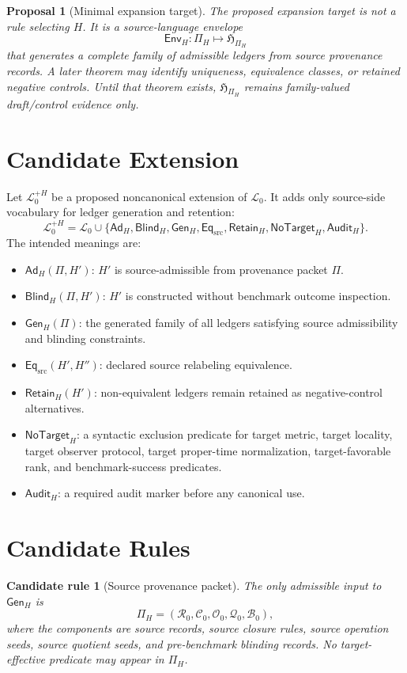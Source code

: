 \documentclass[11pt]{article}
\newcommand{\Lang}{\mathcal{L}_{0}}
\newcommand{\LangPlus}{\mathcal{L}_{0}^{+H}}
\newcommand{\LedgerFam}{\mathfrak{H}}
\newcommand{\PiH}{\Pi_H}
\newcommand{\Ad}{\mathsf{Ad}}
\newcommand{\Blind}{\mathsf{Blind}}
\newcommand{\GenH}{\mathsf{Gen}_{H}}
\newcommand{\EnvH}{\mathsf{Env}_{H}}
\newcommand{\EqSrc}{\mathsf{Eq}_{\mathrm{src}}}
\newcommand{\Retain}{\mathsf{Retain}}
\newcommand{\NoTarget}{\mathsf{NoTarget}}
\newcommand{\Audit}{\mathsf{Audit}}
\newtheorem{proposal}{Proposal}
\newtheorem{axiomcandidate}{Candidate rule}
\begin{document}
\begin{proposal}[Minimal expansion target]
The proposed expansion target is not a rule selecting \(H\). It is a
source-language envelope
\[
    \EnvH:\Pi_H\longmapsto \LedgerFam_{\PiH}
\]
that generates a complete family of admissible ledgers from source
provenance records. A later theorem may identify uniqueness, equivalence
classes, or retained negative controls. Until that theorem exists,
\(\LedgerFam_{\PiH}\) remains family-valued draft/control evidence only.
\end{proposal}

\section{Candidate Extension}

Let \(\LangPlus\) be a proposed noncanonical extension of \(\Lang\). It adds
only source-side vocabulary for ledger generation and retention:
\[
\LangPlus =
\Lang \cup
\{\Ad_H,\Blind_H,\GenH,\EqSrc,\Retain_H,\NoTarget_H,\Audit_H\}.
\]
The intended meanings are:
\begin{itemize}
    \item \(\Ad_H(\Pi,H')\): \(H'\) is source-admissible from provenance
    packet \(\Pi\).
    \item \(\Blind_H(\Pi,H')\): \(H'\) is constructed without benchmark
    outcome inspection.
    \item \(\GenH(\Pi)\): the generated family of all ledgers satisfying
    source admissibility and blinding constraints.
    \item \(\EqSrc(H',H'')\): declared source relabeling equivalence.
    \item \(\Retain_H(H')\): non-equivalent ledgers remain retained as
    negative-control alternatives.
    \item \(\NoTarget_H\): a syntactic exclusion predicate for target metric,
    target locality, target observer protocol, target proper-time
    normalization, target-favorable rank, and benchmark-success predicates.
    \item \(\Audit_H\): a required audit marker before any canonical use.
\end{itemize}

\section{Candidate Rules}

\begin{axiomcandidate}[Source provenance packet]
The only admissible input to \(\GenH\) is
\[
\Pi_H=(\mathcal{R}_{0},\mathcal{C}_{0},\mathcal{O}_{0},
\mathcal{Q}_{0},\mathcal{B}_{0}),
\]
where the components are source records, source closure rules, source
operation seeds, source quotient seeds, and pre-benchmark blinding records.
No target-effective predicate may appear in \(\Pi_H\).
\end{axiomcandidate}
\end{document}
